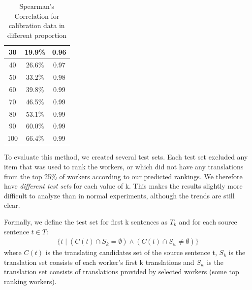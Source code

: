 \documentclass[11pt]{article}
\begin{document}
\begin{table}[h]
\begin{center}
\begin{tabular}{|c|c|c|}
30                                               & 19.9\%                                        & 0.96                                                                               \\ \hline
40                                               & 26.6\%                                        & 0.97                                                                               \\ \hline
50                                               & 33.2\%                                        & 0.98                                                                               \\ \hline
60                                               & 39.8\%                                        & 0.99                                                                               \\ \hline
70                                               & 46.5\%                                        & 0.99                                                                               \\ \hline
80                                               & 53.1\%                                        & 0.99                                                                               \\ \hline
90                                               & 60.0\%                                        & 0.99                                                                               \\ \hline
100                                              & 66.4\%                                        & 0.99                                                                               \\ \hline
\end{tabular}
\end{center}
\caption{\label{spearmansen} Spearman's Correlation for calibration data in different proportion}
\end{table}
To evaluate this method, we created several test sets.  Each test set excluded any item that was used to rank the workers, or which did not have any translations from the top 25\% of workers according to our predicted rankings.  We therefore have \emph{different test sets} for each value of k.  This makes the results slightly more difficult to analyze than in normal experiments, although the trends are still clear.

Formally, we define the test set for first k sentences as $T_k$ and for each source sentence $t \in T$:
\begin{align*}
  \{ t \mid (C(t) \cap S_k = \emptyset)   \wedge (C(t) \cap S_w \neq \emptyset)    \}
\end{align*}
where $C(t)$ is the translating candidates set of the source sentence t, $S_k$ is the translation set consists of each worker's first k translations and $S_w$ is the translation set consists of translations provided by selected workers (some top ranking workers).
\end{document}
